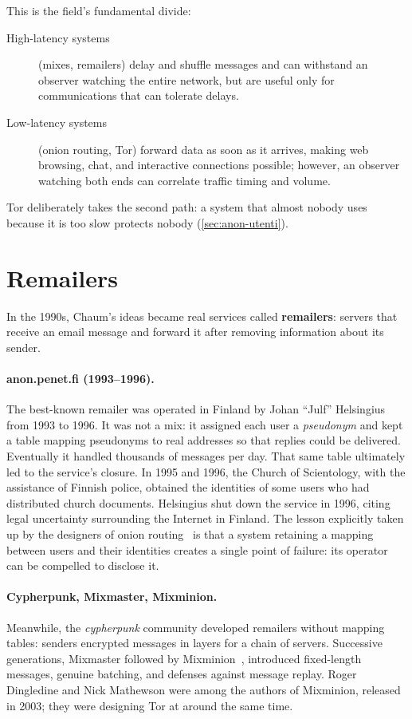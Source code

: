 This is the field's fundamental divide:
\begin{description}
  \item[High-latency systems] (mixes, remailers) delay and shuffle messages and can withstand an observer watching the entire network, but are useful only for communications that can tolerate delays.
  \item[Low-latency systems] (onion routing, Tor) forward data as soon as it arrives, making web browsing, chat, and interactive connections possible; however, an observer watching both ends can correlate traffic timing and volume.
\end{description}
Tor deliberately takes the second path: a system that almost nobody uses because it is too slow protects nobody (\cref{sec:anon-utenti}).

\section{Remailers}\label{sec:radici-remailer}

In the 1990s, Chaum's ideas became real services called \textbf{remailers}: servers that receive an email message and forward it after removing information about its sender.

\paragraph{anon.penet.fi (1993--1996).} The best-known remailer was operated in Finland by Johan \enquote{Julf} Helsingius from 1993 to 1996. It was not a mix: it assigned each user a \emph{pseudonym} and kept a table mapping pseudonyms to real addresses so that replies could be delivered. Eventually it handled thousands of messages per day. That same table ultimately led to the service's closure. In 1995 and 1996, the Church of Scientology, with the assistance of Finnish police, obtained the identities of some users who had distributed church documents. Helsingius shut down the service in 1996, citing legal uncertainty surrounding the Internet in Finland. The lesson explicitly taken up by the designers of onion routing~\cite{syverson2011peel} is that a system retaining a mapping between users and their identities creates a single point of failure: its operator can be compelled to disclose it.

\paragraph{Cypherpunk, Mixmaster, Mixminion.} Meanwhile, the \emph{cypherpunk} community developed remailers without mapping tables: senders encrypted messages in layers for a chain of servers. Successive generations, Mixmaster followed by Mixminion~\cite{danezis2003mixminion}, introduced fixed-length messages, genuine batching, and defenses against message replay. Roger Dingledine and Nick Mathewson were among the authors of Mixminion, released in 2003; they were designing Tor at around the same time.

